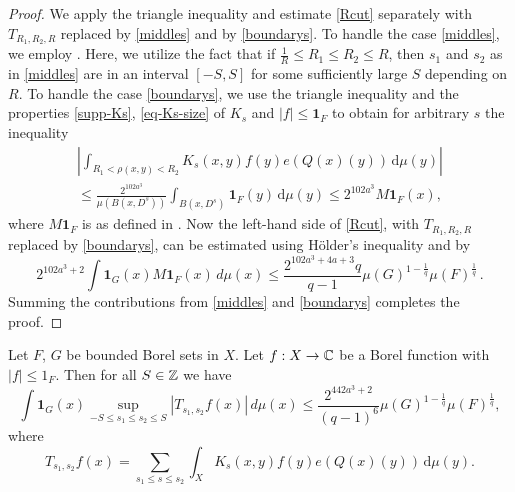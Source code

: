 \begin{proof}
We apply the triangle inequality and estimate \eqref{Rcut} separately with $T_{R_1,R_2,R}$ replaced by \eqref{middles} and by \eqref{boundarys}.
To handle the case \eqref{middles}, we employ . Here, we utilize the fact that if $\frac 1R\le R_1\le R_2\le R$, then $s_1$ and $s_2$ as in \eqref{middles} are in an interval $[-S,S]$ for some sufficiently large $S$ depending on $R$.
To handle the case \eqref{boundarys}, we use the triangle inequality and the properties \eqref{supp-Ks}, \eqref{eq-Ks-size} of $K_s$  and $|f| \le \mathbf{1}_F$ to obtain for arbitrary $s$ the inequality
\begin{multline}
\left|\int_{R_1 < \rho(x,y) < R_2} K_s(x,y) f(y) e(Q(x)(y)) \, \mathrm{d}\mu(y)\right|\\
\leq \frac{2^{102 a^3}}{\mu(B(x, D^{s}))}
 \int_{B(x, D^s)} \mathbf{1}_F(y) \, \mathrm{d}\mu(y)
\leq 2^{102 a^3} M\mathbf{1}_F(x),
\end{multline}
where $M\mathbf{1}_F$ is as defined in .
Now the left-hand side of \eqref{Rcut}, with $T_{R_1,R_2,R}$ replaced by \eqref{boundarys}, can be estimated using H\"older's inequality and  by
$$
    2^{102a^3+2}\int \mathbf{1}_{G}(x) M\mathbf{1}_F(x)\, d\mu(x)
    \le \frac{2^{102a^3+4a+3}q}{q-1}\mu(G)^{1-\frac{1}{q}} \mu(F)^{\frac{1}{q}}\,.
$$
Summing the contributions from \eqref{middles} and \eqref{boundarys} completes the proof.
\end{proof}

\begin{lemma}[S truncation]
    \label{S-truncation}
    \leanok
    Let $F$, $G$ be bounded Borel sets in $X$.
    Let $f:X\to \mathbb{C}$ be a Borel function with $|f|\le 1_F$. Then for all $S\in{\mathbb{Z}}$ we have
    \begin{equation} \label{Scut}
        \int \mathbf{1}_G(x) \sup_{-S\le s_1\le s_2\le S} |T_{s_1,s_2} f(x)|\, d\mu(x)
        \le \frac{2^{442a^3+2}}{(q-1)^6} \mu(G)^{1-\frac{1}{q}} \mu(F)^{\frac{1}{q}},
    \end{equation}
    where
    \begin{equation}\label{Tss}
        T_{s_1,s_2} f(x) = \sum_{s_1\le s \le s_2} \int_X K_s(x,y) f(y) e(Q(x)(y)) \, \mathrm{d}\mu(y).
    \end{equation}
\end{lemma}


